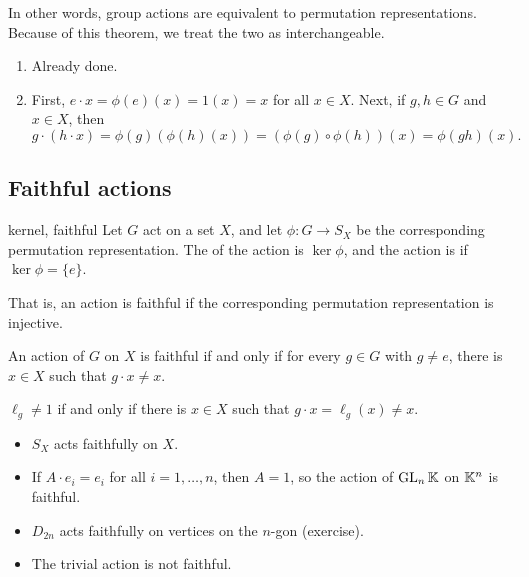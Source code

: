 \documentclass[12pt,letterpaper]{report}
\begin{document}
In other words, group actions are equivalent to permutation representations.
Because of this theorem, we treat the two as interchangeable.

\begin{thmproof}
  \begin{enumerate}
    \item Already done.
    \item First, $e \cdot x = \phi(e)(x) = 1(x) = x$ for all $x \in X$.
    Next, if $g, h \in G$ and $x \in X$, then
    \[ g \cdot (h \cdot x) = \phi(g)(\phi(h)(x)) = (\phi(g) \circ \phi(h))(x) = \phi(gh)(x). \]
  \end{enumerate}
\end{thmproof}

\pagebreak
\subsection{Faithful actions}

\begin{defn}{kernel, faithful}{}
  Let $G$ act on a set $X$, and let $\phi \colon G \to S_X$ be the corresponding permutation
  representation.
  The  of the action is $\ker \phi$, and the action is  if
  $\ker\phi = \{e\}$.
\end{defn}

That is, an action is faithful if the corresponding permutation representation is injective.

\begin{lem}{}{}
  An action of $G$ on $X$ is faithful if and only if for every $g \in G$ with $g \neq e$, there is
  $x \in X$ such that $g \cdot x \neq x$.
\end{lem}

\begin{thmproof}
  $\ell_g \neq 1$ if and only if there is $x \in X$ such that $g \cdot x = \ell_g(x) \neq x$.
\end{thmproof}

\begin{ex}
  \begin{itemize}
    \item $S_X$ acts faithfully on $X$.
    \item If $A \cdot e_i = e_i$ for all $i = 1, \ldots, n$, then $A = 1$, so the action of
      $\operatorname{GL}_n\mathbb{K}$ on $\mathbb{K}^n$ is faithful.
    \item $D_{2n}$ acts faithfully on vertices on the $n$-gon (exercise).
    \item The trivial action is not faithful.
  \end{itemize}
\end{ex}
\end{document}
